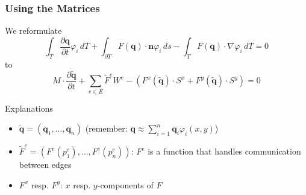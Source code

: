 \documentclass{beamer}
\newcommand{\pd}[2]{\dfrac{\partial #1}{\partial #2}}
\renewcommand{\phi}{\varphi}
\begin{document}
\begin{frame}
  \frametitle{Using the Matrices}
  We reformulate
  \begin{equation*}
    \int_T \pd {\mathbf{q}}{t} \phi_i \, dT +
    \int_{\partial T} F(\mathbf{q}) \cdot \mathbf{n} \phi_i \, ds -
    \int_T F(\mathbf{q}) \cdot \nabla \phi_i \, dT = 0
  \end{equation*}
  to
  \begin{equation*}
    M \cdot \pd{\tilde{\mathbf{q}}}{t} +
    \sum_{e \in E} \tilde{F}^e W^e -
    \left(F^x(\tilde{\mathbf{q}}) \cdot S^x +
      F^y(\tilde{\mathbf{q}}) \cdot S^y\right) = 0
  \end{equation*}
  \begin{block}{Explanations}
    \begin{itemize}
    \item $\tilde{\mathbf{q}} = (\mathbf{q}_1,\dots,\mathbf{q}_n)$ (remember: $\mathbf{q} \approx \sum_{i=1}^n \mathbf{q}_i \phi_i(x,y)$)
    \item $\tilde{F}^e=(F^e(p_1^e),\dots,F^e(p_n^e))$: $F^e$ is a function that handles communication between edges
    \item $F^x$ resp. $F^y$: $x$ resp. $y$-components of $F$
    \end{itemize}
  \end{block}
\end{frame}

\end{document}
